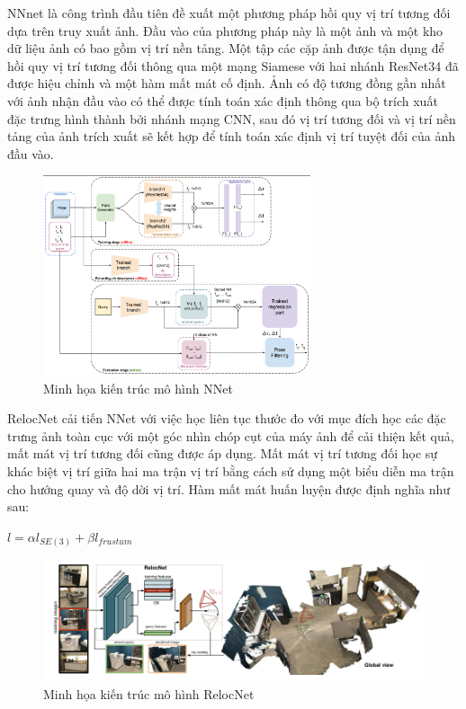 NNnet \cite{laskar2017camera} là công trình đầu tiên đề xuất một phương pháp hồi quy vị trí tương đối dựa trên truy xuất ảnh. Đầu vào của phương pháp này là một ảnh và một kho dữ liệu ảnh có bao gồm vị trí nền tảng. Một tập các cặp ảnh được tận dụng để hồi quy vị trí tương đối thông qua một mạng Siamese với hai nhánh ResNet34 đã được hiệu chỉnh và một hàm mất mát cố định. Ảnh có độ tương đồng gần nhất với ảnh nhận đầu vào có thể được tính toán xác định thông qua bộ trích xuất đặc trưng hình thành bởi nhánh mạng CNN, sau đó vị trí tương đối và vị trí nền tảng của ảnh trích xuất sẽ kết hợp để tính toán xác định vị trí tuyệt đối của ảnh đầu vào.
\begin{figure}[H]
    \centering
    \includegraphics[width=0.7\textwidth]{pics/Chapter2/nnet.png}
    \caption{Minh họa kiến trúc mô hình NNet \cite{laskar2017camera}}
\end{figure}
RelocNet \cite{10.1007/978-3-030-01264-9_46} cải tiến NNet với việc học liên tục thước đo với mục đích học các đặc trưng ảnh toàn cục với một góc nhìn chóp cụt của máy ảnh để cải thiện kết quả, mất mát vị trí tương đối cũng được áp dụng. Mất mát vị trí tương đối học sự khác biệt vị trí giữa hai ma trận vị trí bằng cách sử dụng một biểu diễn ma trận cho hướng quay và độ dời vị trí. Hàm mất mát huấn luyện được định nghĩa như sau:
\begin{center}
$l = \alpha l_{SE(3)} + \beta l_{frustum}$
\end{center}
\begin{figure}[H]
    \centering
    \includegraphics[width=\textwidth]{pics/Chapter2/relocnet.png}
    \caption{Minh họa kiến trúc mô hình RelocNet \cite{10.1007/978-3-030-01264-9_46}}
\end{figure}
